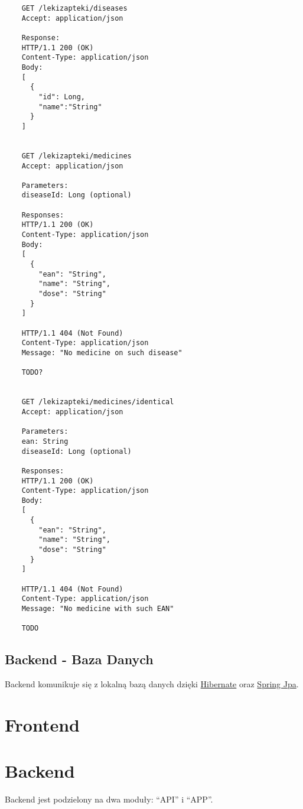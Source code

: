\documentclass{article}
\begin{document}
  \begin{lstlisting}
    GET /lekizapteki/diseases
    Accept: application/json

    Response:
    HTTP/1.1 200 (OK)
    Content-Type: application/json
    Body:
    [
      {
        "id": Long,
        "name":"String"
      }
    ]


    GET /lekizapteki/medicines
    Accept: application/json

    Parameters:
    diseaseId: Long (optional)

    Responses:
    HTTP/1.1 200 (OK)
    Content-Type: application/json
    Body:
    [
      {
        "ean": "String",
        "name": "String",
        "dose": "String"
      }
    ]

    HTTP/1.1 404 (Not Found)
    Content-Type: application/json
    Message: "No medicine on such disease"

    TODO?


    GET /lekizapteki/medicines/identical
    Accept: application/json

    Parameters:
    ean: String
    diseaseId: Long (optional)

    Responses:
    HTTP/1.1 200 (OK)
    Content-Type: application/json
    Body:
    [
      {
        "ean": "String",
        "name": "String",
        "dose": "String"
      }
    ]

    HTTP/1.1 404 (Not Found)
    Content-Type: application/json
    Message: "No medicine with such EAN"

    TODO

  \end{lstlisting}

  \subsection{Backend - Baza Danych}
  Backend komunikuje się z lokalną bazą danych dzięki
  \href{https://hibernate.org}{Hibernate} oraz
  \href{https://spring.io/projects/spring-data-jpa} {Spring Jpa}.

  \section{Frontend}

  \section{Backend}
  Backend jest podzielony na dwa moduły: ``API'' i ``APP''.
\end{document}
